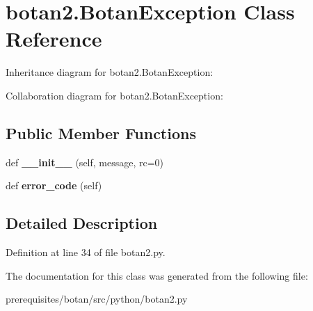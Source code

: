 \hypertarget{classbotan2_1_1_botan_exception}{}\section{botan2.\+Botan\+Exception Class Reference}
\label{classbotan2_1_1_botan_exception}


Inheritance diagram for botan2.\+Botan\+Exception\+:


Collaboration diagram for botan2.\+Botan\+Exception\+:
\subsection*{Public Member Functions}
\begin{DoxyCompactItemize}
\item 
\mbox{\label{classbotan2_1_1_botan_exception_a9d157e3e3948f03f84729f5b7178381d}} 
def {\bfseries \+\_\+\+\_\+init\+\_\+\+\_\+} (self, message, rc=0)
\item 
\mbox{\label{classbotan2_1_1_botan_exception_af677d922a39a276170973d4115afd463}} 
def {\bfseries error\+\_\+code} (self)
\end{DoxyCompactItemize}


\subsection{Detailed Description}


Definition at line 34 of file botan2.\+py.



The documentation for this class was generated from the following file\+:\begin{DoxyCompactItemize}
\item 
prerequisites/botan/src/python/botan2.\+py\end{DoxyCompactItemize}
